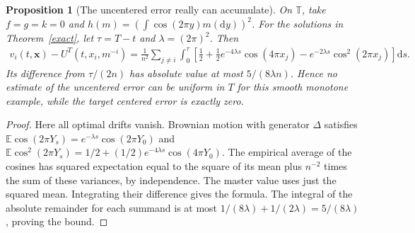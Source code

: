 \documentclass[11pt]{article}
\newtheorem{proposition}[theorem]{Proposition}
\newcommand{\E}{\mathbb E}
\newcommand{\T}{\mathbb T}
\newcommand{\dd}{\mathrm d}
\begin{document}
\begin{proposition}[The uncentered error really can accumulate]\label{accumulate}
On $\T$, take $f=g=k=0$ and $h(m)=(\int\cos(2\pi y)m(\dd y))^2$. For the solutions in Theorem~\ref{exact}, let $\tau=T-t$ and $\lambda=(2\pi)^2$. Then
\begin{align*}
 v_i(t,\boldsymbol x)-U^T(t,x_i,m^{-i})
 =\frac1{n^2}\sum_{j\ne i}\int_0^\tau
 \left[\frac12+\frac12e^{-4\lambda s}\cos(4\pi x_j)
             -e^{-2\lambda s}\cos^2(2\pi x_j)\right]\dd s.
\end{align*}
Its difference from $\tau/(2n)$ has absolute value at most $5/(8\lambda n)$. Hence no estimate of the uncentered error can be uniform in $T$ for this smooth monotone example, while the target centered error is exactly zero.
\end{proposition}
\begin{proof}
Here all optimal drifts vanish. Brownian motion with generator $\Delta$ satisfies
$\E\cos(2\pi Y_s)=e^{-\lambda s}\cos(2\pi Y_0)$ and
$\E\cos^2(2\pi Y_s)=1/2+(1/2)e^{-4\lambda s}\cos(4\pi Y_0)$.
The empirical average of the cosines has squared expectation equal to the square of its mean plus $n^{-2}$ times the sum of these variances, by independence. The master value uses just the squared mean. Integrating their difference gives the formula. The integral of the absolute remainder for each summand is at most $1/(8\lambda)+1/(2\lambda)=5/(8\lambda)$, proving the bound.
\end{proof}
\end{document}
